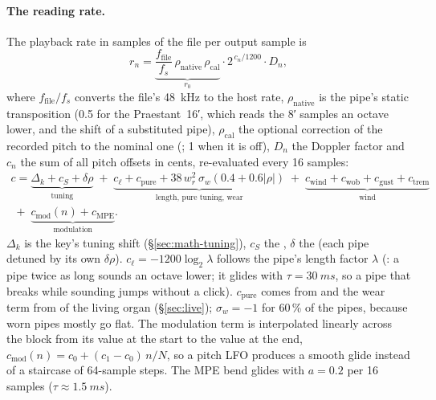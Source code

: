 \paragraph{The reading rate.} The playback rate in samples of the file per output sample is
\begin{equation}
  r_n = \underbrace{\frac{f_\mathrm{file}}{f_s}\,\rho_\mathrm{native}\,\rho_\mathrm{cal}}_{r_0}
        \cdot 2^{\,c_n/1200}\cdot D_n ,
\end{equation}
where $f_\mathrm{file}/f_s$ converts the file's \SI{48}{kHz} to the host rate, $\rho_\mathrm{native}$ is the pipe's
static transposition (0.5 for the Praestant~16′, which reads the 8′ samples an octave lower, and the shift of a
substituted pipe), $\rho_\mathrm{cal}$ the optional correction of the recorded pitch to the nominal one
(; 1 when it is off), $D_n$ the Doppler factor and $c_n$ the sum of all pitch offsets in cents,
re-evaluated every 16 samples:
\begin{multline}
  c = \underbrace{\Delta_k + c_S + \delta\rho}_{\text{tuning}}
     \;+\; \underbrace{c_\ell + c_\mathrm{pure} + 38\,w_r^2\,\sigma_w(0.4+0.6|\rho|)}_{\text{length, pure tuning, wear}}
     \;+\; \underbrace{c_\mathrm{wind} + c_\mathrm{wob} + c_\mathrm{gust} + c_\mathrm{trem}}_{\text{wind}}\\
     \;+\; \underbrace{c_\mathrm{mod}(n) + c_\mathrm{MPE}}_{\text{modulation}} .
\end{multline}
$\Delta_k$ is the key's tuning shift (\S\ref{sec:math-tuning}), $c_S$ the , $\delta$ the
 (each pipe detuned by its own $\delta\rho$). $c_\ell = -1200\log_2\lambda$ follows the pipe's length
factor $\lambda$ (: a pipe twice as long sounds an octave lower; it glides with
$\tau=\SI{30}{ms}$, so a pipe that breaks while sounding jumps without a click). $c_\mathrm{pure}$ comes from
 and the wear term from  of the living organ (\S\ref{sec:live}); $\sigma_w=-1$ for
60\,\% of the pipes, because worn pipes mostly go flat. The modulation term is interpolated linearly across the
block from its value at the start to the value at the end, $c_\mathrm{mod}(n) = c_0 + (c_1-c_0)\,n/N$, so a pitch LFO
produces a smooth glide instead of a staircase of 64-sample steps. The MPE bend glides with
$a=0.2$ per 16 samples ($\tau\approx\SI{1.5}{ms}$).

